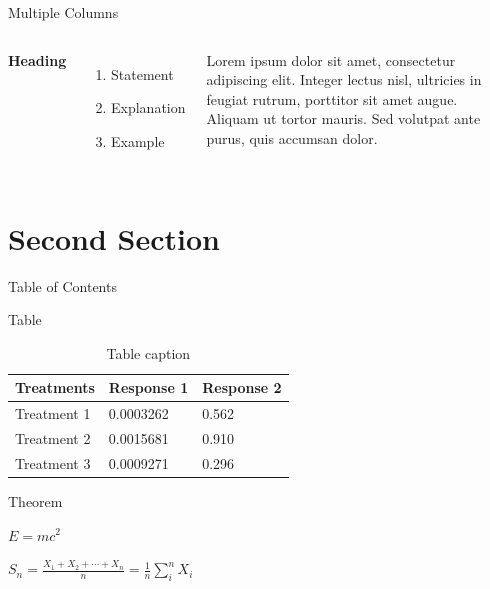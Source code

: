 \documentclass[aspectratio=169]{beamer}
\begin{document}
\begin{frame}{Multiple Columns}
  \begin{columns}[c] %
    \textbf{Heading}
    \begin{enumerate}
      \item Statement
      \item Explanation
      \item Example
    \end{enumerate}
    Lorem ipsum dolor sit amet, consectetur adipiscing elit. Integer lectus nisl, ultricies in feugiat rutrum, porttitor sit amet augue. Aliquam ut tortor mauris. Sed volutpat ante purus, quis accumsan dolor.
  \end{columns}
\end{frame}

\section{Second Section} %
  
\begin{frame}{Table of Contents} 
  \tableofcontents[currentsection] 
\end{frame}
  
\begin{frame}{Table}
  \begin{table}
    \caption{Table caption}
    \begin{tabular}{l l l}
      \toprule
      \textbf{Treatments} & \textbf{Response 1} & \textbf{Response 2}\\
      \midrule
      Treatment 1 & 0.0003262 & 0.562 \\
      Treatment 2 & 0.0015681 & 0.910 \\
      Treatment 3 & 0.0009271 & 0.296 \\
      \bottomrule
    \end{tabular}
  \end{table}
\end{frame}
  
\begin{frame}{Theorem}
  \begin{theorem}
    $E = mc^2$
  \end{theorem}
  \begin{theorem}
    $S_n = \frac{X_1 + X_2 + \cdots + X_n}{n} = \frac{1}{n}\sum_{i}^{n} X_i$
  \end{theorem}
\end{frame}
\end{document}
